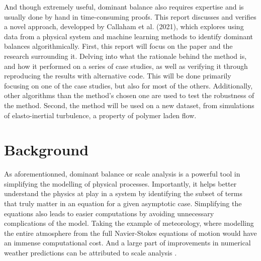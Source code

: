 \documentclass[12pt]{report} %
\begin{document}
And though extremely useful, dominant balance also requires expertise and is usually done by hand in time-consuming proofs. This report discusses and verifies a novel approach, developped by Callaham et al. (2021)\cite{callaham2021learning}, which explores using data from a physical system and machine learning methods to identify dominant balances algorithmically. First, this report will focus on the paper and the research surrounding it. Delving into what the rationale behind the method is, and how it performed on a series of case studies, as well as verifying it through reproducing the results with alternative code. This will be done primarily focusing on one of the case studies, but also for most of the others. Additionally, other algorithms than the method's chosen one are used to test the robustness of the method. Second, the method will be used on a new dataset, from simulations of elasto-inertial turbulence, a property of polymer laden flow.


\chapter{Background}


As aforementionned, dominant balance or scale analysis is a powerful tool in simplifying the modelling of physical processes. Importantly, it helps better understand the physics at play in a system by identifying the subset of terms that truly matter in an equation for a given asymptotic case. Simplifying the equations also leads to easier computations by avoiding unnecessary complications of the model. Taking the example of meteorology, where modelling the entire atmosphere from the full Navier-Stokes equations of motion would have an immense computational cost. And a large part of improvements in numerical weather predictions can be attributed to scale analysis \cite{charney1947dynamics, phillips1963geostrophic, burger1958scale, yano2009scale}.

\vspace{5mm}
\end{document}
